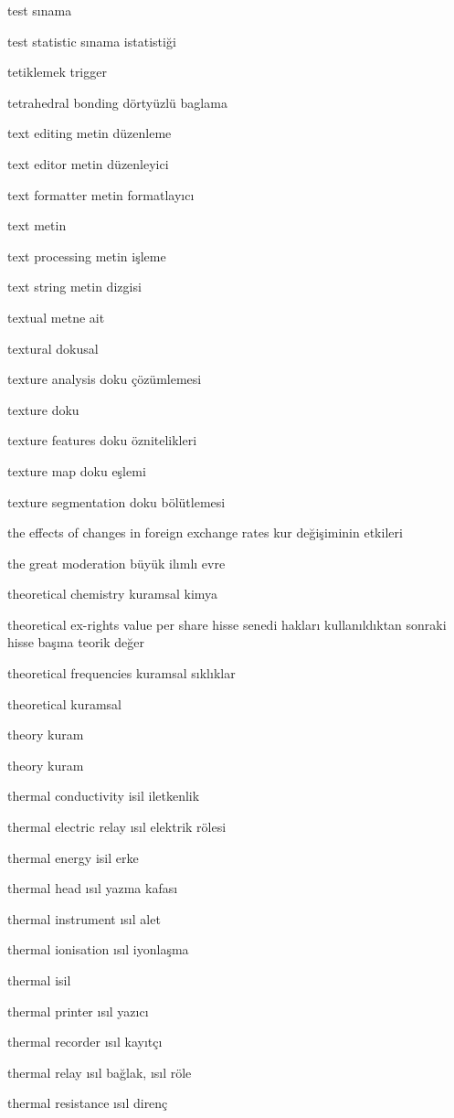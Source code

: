 \documentclass[12pt,fleqn]{article}\usepackage{../../common}
\begin{document}
test sınama

test statistic sınama istatistiği

tetiklemek trigger

tetrahedral bonding dörtyüzlü baglama

text editing metin düzenleme

text editor metin düzenleyici

text formatter metin formatlayıcı

text metin

text processing metin işleme

text string metin dizgisi

textual metne ait

textural dokusal

texture analysis doku çözümlemesi

texture doku

texture features doku öznitelikleri

texture map doku eşlemi

texture segmentation doku bölütlemesi

the effects of changes in foreign exchange rates kur değişiminin etkileri

the great moderation büyük ilımlı evre

theoretical chemistry kuramsal kimya

theoretical ex-rights value per share hisse senedi hakları kullanıldıktan sonraki hisse başına teorik değer

theoretical frequencies kuramsal sıklıklar

theoretical kuramsal

theory kuram

theory kuram

thermal conductivity isil iletkenlik

thermal electric relay ısıl elektrik rölesi

thermal energy isil erke

thermal head ısıl yazma kafası

thermal instrument ısıl alet

thermal ionisation ısıl iyonlaşma

thermal isil

thermal printer ısıl yazıcı

thermal recorder ısıl kayıtçı

thermal relay ısıl bağlak, ısıl röle

thermal resistance ısıl direnç
\end{document}
